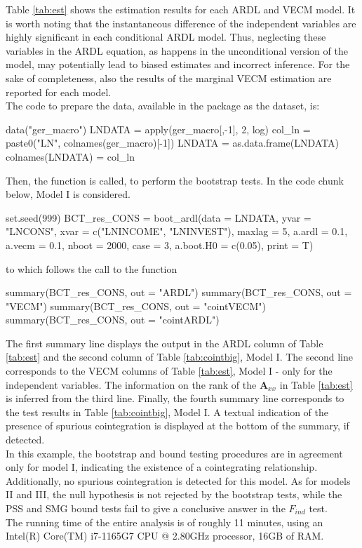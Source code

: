 \noindent Table \ref{tab:est} shows the estimation results for each  ARDL and VECM model. It is worth noting that the instantaneous difference of the independent variables are highly significant in each conditional ARDL model.
Thus, neglecting these variables in the ARDL equation, as happens in the unconditional version of the model, may potentially lead to biased estimates and incorrect inference.
For the sake of completeness, also the results of the marginal VECM estimation are reported for each model.\\
The code to prepare the data, available in the package as the  dataset, is:
\begin{example}
    data("ger_macro")
    LNDATA = apply(ger_macro[,-1], 2, log)
    col_ln = paste0("LN", colnames(ger_macro)[-1])
    LNDATA = as.data.frame(LNDATA)
    colnames(LNDATA) = col_ln
\end{example}

\noindent Then, the  function is called, to perform the bootstrap tests. In the code chunk below, Model I is considered.

\begin{example}
    set.seed(999)
    BCT_res_CONS = boot_ardl(data = LNDATA,
                         yvar = "LNCONS",
                         xvar = c("LNINCOME", "LNINVEST"),
                         maxlag = 5,
                         a.ardl = 0.1,
                         a.vecm = 0.1,
                         nboot = 2000,
                         case = 3,
                         a.boot.H0 = c(0.05),
                         print = T)
\end{example}
to which follows the call to the  function
\begin{example}
    summary(BCT_res_CONS, out = "ARDL")
    summary(BCT_res_CONS, out = "VECM")
    summary(BCT_res_CONS, out = "cointVECM")
    summary(BCT_res_CONS, out = "cointARDL")
\end{example}
The first summary line displays the output in the ARDL column of Table \ref{tab:est} and the second column of Table \ref{tab:cointbig}, Model I. The second line corresponds to the VECM columns of Table \ref{tab:est}, Model I - only for the independent variables. The information on the rank of the $\mathbf A_{xx}$ in Table \ref{tab:est} is inferred from the third line. Finally, the fourth summary line corresponds to the test results in Table \ref{tab:cointbig}, Model I.
A textual indication of the presence of spurious cointegration is displayed at the bottom of the  summary, if detected.\\
In this example, the bootstrap and bound testing procedures are in agreement only for model I, indicating the existence of a cointegrating relationship. Additionally, no spurious cointegration is detected for this model. As for models II and III, the null hypothesis is not rejected by the bootstrap tests, while the PSS and SMG bound tests fail to give a conclusive answer in the $F_{ind}$ test.\\
The running time of the entire analysis is of roughly 11 minutes, using an Intel(R) Core(TM) i7-1165G7 CPU @ 2.80GHz processor, 16GB of RAM.

